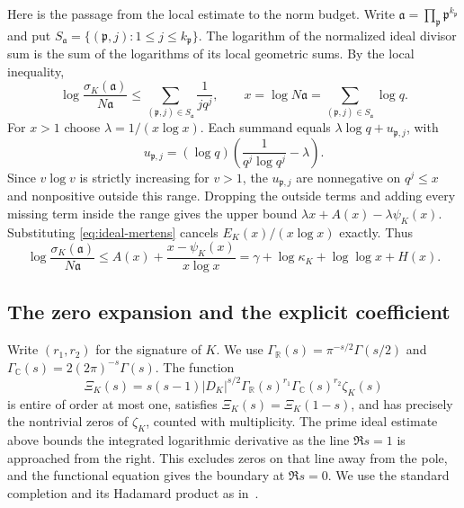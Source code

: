 \documentclass[11pt]{amsart}
\theoremstyle{definition}
\theoremstyle{remark}
\numberwithin{equation}{section}
\begin{document}
Here is the passage from the local estimate to the norm budget.
Write \(\mathfrak a=\prod_{\mathfrak p}\mathfrak p^{k_{\mathfrak p}}\)
and put \(S_{\mathfrak a}=\{(\mathfrak p,j):1\leq j\leq k_{\mathfrak p}\}\).
The logarithm of the normalized ideal divisor sum is the sum
of the logarithms of its local geometric sums. By the local inequality,
\[
 \log\frac{\sigma_K(\mathfrak a)}{N\mathfrak a}
 \leq\sum_{(\mathfrak p,j)\in S_{\mathfrak a}}\frac1{j q^j},
 \qquad
 x=\log N\mathfrak a
   =\sum_{(\mathfrak p,j)\in S_{\mathfrak a}}\log q .
\]
For \(x>1\) choose \(\lambda=1/(x\log x)\). Each summand equals
\(\lambda\log q+u_{\mathfrak p,j}\), with
\[
 u_{\mathfrak p,j}=(\log q)
       \left(\frac{1}{q^j\log q^j}-\lambda\right).
\]
Since \(v\log v\) is strictly increasing for \(v>1\), the
\(u_{\mathfrak p,j}\) are nonnegative on \(q^j\leq x\) and
nonpositive outside this range. Dropping the outside terms
and adding every missing term inside the range gives the
upper bound \(\lambda x+A(x)-\lambda\psi_K(x)\). Substituting
\eqref{eq:ideal-mertens} cancels \(E_K(x)/(x\log x)\) exactly. Thus
\begin{equation}\label{eq:ideal-supporting-line}
 \log\frac{\sigma_K(\mathfrak a)}{N\mathfrak a}
 \leq A(x)+\frac{x-\psi_K(x)}{x\log x}
 =\gamma+\log\kappa_K+\log\log x+H(x).
\end{equation}

\subsection{The zero expansion and the explicit coefficient}

Write \((r_1,r_2)\) for the signature of \(K\). We use
\(\Gamma_{\mathbb R}(s)=\pi^{-s/2}\Gamma(s/2)\) and
\(\Gamma_{\mathbb C}(s)=2(2\pi)^{-s}\Gamma(s)\).
The function
\[
 \Xi_K(s)=s(s-1)|D_K|^{s/2}
       \Gamma_{\mathbb R}(s)^{r_1}\Gamma_{\mathbb C}(s)^{r_2}
       \zeta_K(s)
\]
is entire of order at most one, satisfies \(\Xi_K(s)=\Xi_K(1-s)\),
and has precisely the nontrivial zeros of \(\zeta_K\), counted with
multiplicity. The prime ideal estimate above bounds the integrated logarithmic
derivative as the line \(\Re s=1\) is approached from the right.
This excludes zeros on that line away from the pole, and the
functional equation gives the boundary at \(\Re s=0\). We use the standard completion
and its Hadamard product as in~\cite[\S\,3]{GrenieMolteniSmoothed}.
\end{document}
